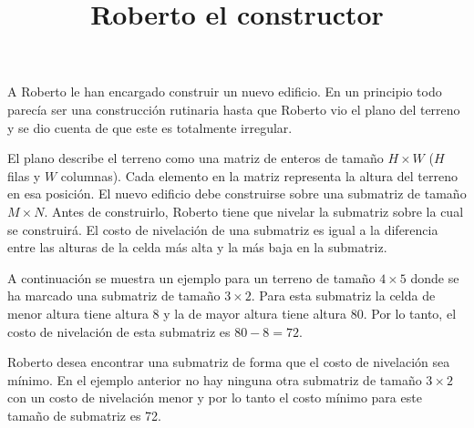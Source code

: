 \documentclass{oci}
\title{Roberto el constructor}
\begin{document}
\begin{problemDescription}
  A Roberto le han encargado construir un nuevo edificio.
  En un principio todo parecía ser una construcción rutinaria hasta que Roberto vio el plano
  del terreno y se dio cuenta de que este es totalmente irregular.

  El plano describe el terreno como una matriz de enteros de tamaño $H\times W$
  ($H$ filas y $W$ columnas).
  Cada elemento en la matriz representa la altura del terreno en esa posición.
  El nuevo edificio debe construirse sobre una submatriz de tamaño $M\times N$.
  Antes de construirlo, Roberto tiene que nivelar la submatriz sobre la cual se construirá.
  El costo de nivelación de una submatriz es igual a la diferencia entre las alturas de la celda
  más alta y la más baja en la submatriz.

  A continuación se muestra un ejemplo para un terreno de tamaño $4\times 5$ donde se ha marcado
  una submatriz de tamaño $3\times 2$.
  Para esta submatriz la celda de menor altura tiene altura 8 y la de mayor altura tiene altura 80.
  Por lo tanto, el costo de nivelación de esta submatriz es $80 - 8=72$.

  \begin{center}
  \end{center}

  Roberto desea encontrar una submatriz de forma que el costo de nivelación sea mínimo.
  En el ejemplo anterior no hay ninguna otra submatriz de tamaño $3\times 2$ con un costo de
  nivelación menor y por lo tanto el costo mínimo para este tamaño de submatriz es 72.
\end{problemDescription}
\end{document}
